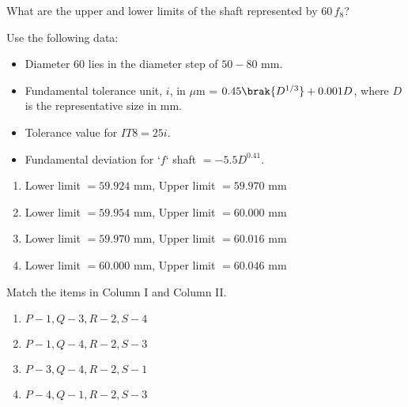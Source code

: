 \iffalse
                       
                        
                        
                        
                    
\author{AI24BTECH11006 - Bugada Roopansha}
\section{ME}
\chapter{2009}
\fi
                            
 \item What are the upper and lower limits of the shaft represented by $60 \, f_8$?
    
    Use the following data:
    \begin{itemize}
        \item Diameter $60$ lies in the diameter step of $50 - 80$ mm.
        \item Fundamental tolerance unit, $i$, in $\mu$m = $0.45 \brak{D^{1/3}} + 0.001 D$, where $D$ is the representative size in mm.
        \item Tolerance value for $IT8 = 25i$.
        \item Fundamental deviation for `$f$` shaft $= -5.5 D^{0.41}$.
    \end{itemize}
    
    \begin{enumerate}
        \item Lower limit $= 59.924$ mm, Upper limit $= 59.970$ mm
        \item Lower limit $= 59.954$ mm, Upper limit $= 60.000$ mm
        \item Lower limit $= 59.970$ mm, Upper limit $= 60.016$ mm
        \item Lower limit $= 60.000$ mm, Upper limit $= 60.046$ mm
    \end{enumerate}
    
    \item Match the items in Column I and Column II.
    
    
    
    \begin{enumerate}
        \item $P - 1, Q - 3, R - 2, S - 4$
        \item $P - 1, Q - 4, R - 2, S - 3$
        \item $P - 3, Q - 4, R - 2, S - 1$
        \item $P - 4, Q - 1, R - 2, S - 3$
    \end{enumerate}
  

